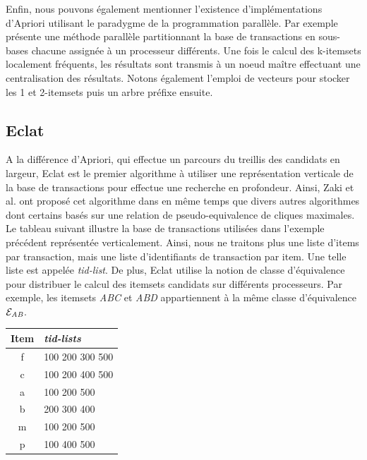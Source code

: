 \documentclass[a4paper,10pt]{report}
\begin{document}
\hspace{0.15cm}Enfin, nous pouvons également mentionner l'existence d'implémentations d'Apriori utilisant le paradygme de la programmation parallèle. Par exemple \cite{YE06} présente une méthode parallèle partitionnant la base de transactions en sous-bases chacune assignée à un processeur différents. Une fois le calcul des k-itemsets localement fréquents, les résultats sont transmis à un noeud maître effectuant une centralisation des résultats. Notons également l'emploi de vecteurs pour stocker les 1 et 2-itemsets puis un arbre préfixe ensuite. \\

\subsection{Eclat}

\hspace{0.15cm}A la différence d'Apriori, qui effectue un parcours du treillis des candidats en largeur, Eclat est le premier algorithme à utiliser une représentation verticale de la base de transactions pour effectue une recherche en profondeur. Ainsi, Zaki et al. ont proposé cet algorithme dans \cite{ZAK00} en même temps que divers autres algorithmes dont certains basés sur une relation de pseudo-equivalence de cliques maximales.  \\

\hspace{0.15cm}Le tableau suivant  illustre la base de transactions utilisées dans l'exemple précédent représentée verticalement. Ainsi, nous ne traitons plus une liste d'items par transaction, mais une liste d'identifiants de transaction par item. Une telle liste est appelée \emph{tid-list}. De plus, Eclat utilise la notion de classe d'équivalence pour distribuer le calcul des itemsets candidats sur différents processeurs. Par exemple, les itemsets \emph{ABC} et \emph{ABD} appartiennent à la même classe d'équivalence $\mathcal{E}_\emph{AB}$.

\begin{center}

\begin{tabular}{|c|l|}
	\hline
	Item & \emph{tid-lists} \\
	\hline
	f & 100 200 300 500 \\
	\hline
	c & 100 200 400 500 \\
	\hline
	a & 100 200 500\\
	\hline
	b & 200 300 400 \\
	\hline
	m & 100 200 500 \\
	\hline
	p & 100 400 500\\
	\hline
\end{tabular}

\vspace{0.4cm}
\end{center}
\end{document}

